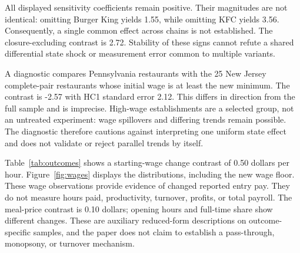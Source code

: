 \documentclass[11pt]{article}
\newcommand{\result}[2]{#2}
\begin{document}
All displayed sensitivity coefficients remain positive. Their magnitudes are not identical: omitting Burger King yields \result{robust_omit_chain1.estimate}{1.55}, while omitting KFC yields \result{robust_omit_chain2.estimate}{3.56}. Consequently, a single common effect across chains is not established. The closure-excluding contrast is \result{robust_no_permanent.estimate}{2.72}. Stability of these signs cannot refute a shared differential state shock or measurement error common to multiple variants. %

A diagnostic compares Pennsylvania restaurants with the \result{highwage.n_nj}{25} New Jersey complete-pair restaurants whose initial wage is at least the new minimum. The contrast is \result{highwage.estimate}{-2.57} with HC1 standard error \result{highwage.std_error}{2.12}. This differs in direction from the full sample and is imprecise. High-wage establishments are a selected group, not an untreated experiment: wage spillovers and differing trends remain possible. The diagnostic therefore cautions against interpreting one uniform state effect and does not validate or reject parallel trends by itself. %

Table~\ref{tab:outcomes} shows a starting-wage change contrast of \result{outcome_starting_wage.estimate}{0.50} dollars per hour. Figure~\ref{fig:wages} displays the distributions, including the new wage floor. These wage observations provide evidence of changed reported entry pay. They do not measure hours paid, productivity, turnover, profits, or total payroll. The meal-price contrast is \result{outcome_meal_price.estimate}{0.10} dollars; opening hours and full-time share show different changes. These are auxiliary reduced-form descriptions on outcome-specific samples, and the paper does not claim to establish a pass-through, monopsony, or turnover mechanism. %
\end{document}
